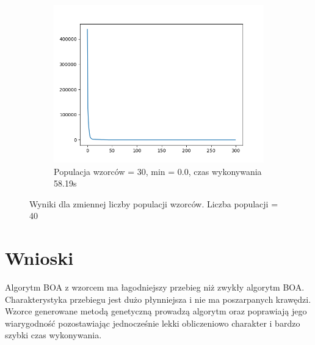 \documentclass[12pt]{article}
\begin{document}
\begin{figure}[H]
\begin{subfigure}{0.32\textwidth}
        \includegraphics[width=\linewidth]{plots/c6.png}
        \caption{Populacja wzorców = 30, min = 0.0, czas wykonywania 58.19s}
    \end{subfigure}
    \caption{Wyniki dla zmiennej liczby populacji wzorców. Liczba populacji = 40}
\end{figure}


 
\section{Wnioski}
Algorytm BOA z wzorcem ma łagodniejszy przebieg niż zwykły algorytm BOA. Charakterystyka przebiegu jest dużo płynniejsza i nie ma poszarpanych krawędzi. Wzorce generowane metodą genetyczną prowadzą algorytm oraz poprawiają jego wiarygodność pozostawiając jednocześnie lekki obliczeniowo charakter i bardzo szybki czas wykonywania.
\end{document}
